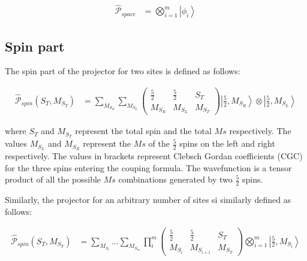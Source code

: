 \documentclass[12pt,twoside]{report}
\begin{document}
	\begin{equation}
		\begin{split}
			\hat{\mathcal{P}}_{space} & = \bigotimes_{i = 1}^{m}\left|\phi_i\right\rangle
		\end{split}
		\label{eq:demodel}
	\end{equation}

	\subsection{Spin part}

	The spin part of the projector for two sites is defined as follows:


	\begin{equation}
		\begin{split}
			\hat{\mathcal{P}}_{spin}(S_T,M_{S_T}) & = \sum_{M_{S_R}}\sum_{M_{S_L}} \begin{pmatrix} \frac{5}{2} & \frac{5}{2} & S_T\\ M_{S_R} & M_{S_L} & M_{S_T} \end{pmatrix}\left |\frac{5}{2},M_{S_R}\right\rangle\otimes\left|\frac{5}{2},M_{S_L}\right\rangle
		\end{split}
		\label{eq:demodel}
	\end{equation}

	where $S_T$ and $M_{S_T}$ represent the total spin and the total $Ms$
	respectively. The values $M_{S_L}$ and $M_{S_R}$ represent the $Ms$ of the
	$\frac{5}{2}$ spins on the left and right respectively. The values in
	brackets represent Clebsch Gordan coefficients (CGC) for the three spins
	entering the couping formula.  The wavefunction is a tensor product of all
	the possible $Ms$ combinations generated by two $\frac{5}{2}$ spins.

	Similarly, the projector for an arbitrary number of sites si similarly defined
	as follows:

	\begin{equation}
		\begin{split}
			\hat{\mathcal{P}}_{spin}(S_T,M_{S_T}) & = \sum_{M_{S_i}}\dots\sum_{M_{S_m}} \prod_{i}^{m} \begin{pmatrix} \frac{5}{2} & \frac{5}{2} & S_T\\ M_{S_i} & M_{S_{i+1}} & M_{S_T} \end{pmatrix}
			\bigotimes_{i = 1}^{m}\left|\frac{5}{2},M_{S_i}\right\rangle
		\end{split}
		\label{eq:demodel}
	\end{equation}
\end{document}
